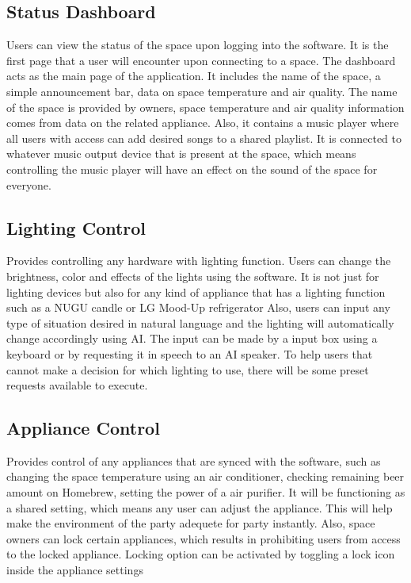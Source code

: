 \documentclass[conference]{IEEEtran}
\begin{document}
    \subsection{Status Dashboard}
    Users can view the status of the space upon logging into the software. It is the first page that a user will encounter upon connecting to a space. The dashboard acts as the main page of the application. It includes the name of the space, a simple announcement bar, data on space temperature and air quality. The name of the space is provided by owners, space temperature and air quality information comes from data on the related appliance. Also, it contains a music player where all users with access can add desired songs to a shared playlist. It is connected to whatever music output device that is present at the space, which means controlling the music player will have an effect on the sound of the space for everyone. 

    \subsection{Lighting Control}
    Provides controlling any hardware with lighting function. Users can change the brightness, color and effects of the lights using the software. It is not just for lighting devices but also for any kind of appliance that has a lighting function such as a NUGU candle or LG Mood-Up refrigerator Also, users can input any type of situation desired in natural language and the lighting will automatically change accordingly using AI. The input can be made by a input box using a keyboard or by requesting it in speech to an AI speaker. To help users that cannot make a decision for which lighting to use, there will be some preset requests available to execute.

    \subsection{Appliance Control}
    Provides control of any appliances that are synced with the software, such as changing the space temperature using an air conditioner, checking remaining beer amount on Homebrew,  setting the power of a air purifier. It will be functioning as a shared setting, which means any user can adjust the appliance. This will help make the environment of the party adequete for party instantly. Also, space owners can lock certain appliances, which results in prohibiting users from access to the locked appliance. Locking option can be activated by toggling a lock icon inside the appliance settings
\end{document}
